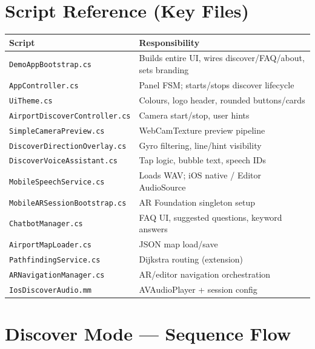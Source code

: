 \documentclass[11pt,a4paper]{article}
\begin{document}
\section{Script Reference (Key Files)}

\begin{longtable}{@{}p{4.8cm}p{9.5cm}@{}}
\toprule
\textbf{Script} & \textbf{Responsibility} \\
\midrule
\endhead
\texttt{DemoAppBootstrap.cs} & Builds entire UI, wires discover/FAQ/about, sets branding \\
\texttt{AppController.cs} & Panel FSM; starts/stops discover lifecycle \\
\texttt{UiTheme.cs} & Colours, logo header, rounded buttons/cards \\
\texttt{AirportDiscoverController.cs} & Camera start/stop, user hints \\
\texttt{SimpleCameraPreview.cs} & WebCamTexture preview pipeline \\
\texttt{DiscoverDirectionOverlay.cs} & Gyro filtering, line/hint visibility \\
\texttt{DiscoverVoiceAssistant.cs} & Tap logic, bubble text, speech IDs \\
\texttt{MobileSpeechService.cs} & Loads WAV; iOS native / Editor AudioSource \\
\texttt{MobileARSessionBootstrap.cs} & AR Foundation singleton setup \\
\texttt{ChatbotManager.cs} & FAQ UI, suggested questions, keyword answers \\
\texttt{AirportMapLoader.cs} & JSON map load/save \\
\texttt{PathfindingService.cs} & Dijkstra routing (extension) \\
\texttt{ARNavigationManager.cs} & AR/editor navigation orchestration \\
\texttt{IosDiscoverAudio.mm} & AVAudioPlayer + session config \\
\bottomrule
\end{longtable}

\section{Discover Mode --- Sequence Flow}
\end{document}
